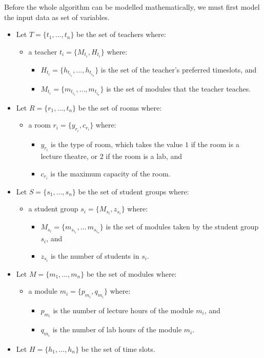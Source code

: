 \documentclass[a4paper, 12pt]{report}
\begin{document}
Before the whole algorithm can be modelled mathematically, we must first model 
the input data as set of variables.
\begin{itemize}
	\item Let \( T = \{ t_1 , \ldots , t_n \} \) be the set of teachers where:
	\begin{itemize}
		\item a teacher \( t_i = \{ M_{t_i}, H_{t_i} \} \) where:
		\begin{itemize} 
			\item \( H_{t_i} = \{ h_{t_{i_1}} , \ldots , h_{t_{i_n}} \} \) is 
				the set of the teacher's preferred timeslots, and
			\item \( M_{t_i} = \{ m_{t_{i_1}} , \ldots , m_{t_{i_n}} \} \) is 
				the set of modules that the teacher teaches.
		\end{itemize}
	\end{itemize}
	\item Let \( R = \{ r_1 , \ldots , t_n \} \) be the set of rooms where:
	\begin{itemize}
		\item a room \( r_i = \{ y_{r_i} , c_{r_i} \} \) where:
		\begin{itemize}
			\item \( y_{r_i} \) is the type of room, which takes the value 
				\( 1 \) if the room is a lecture theatre, or \( 2 \) if the room
				is a lab, and
			\item \( c_{r_i} \) is the maximum capacity of the room.
		\end{itemize}
	\end{itemize}
	\item Let \( S = \{ s_1 , \ldots , s_n \} \) be the set of student groups
		where:
	\begin{itemize}
		\item a student group \( s_i = \{ M_{s_i} , z_{s_i} \} \) where:
		\begin{itemize}
			\item \( M_{s_i} = \{ m_{s_{i_1}} , \ldots \, m_{s_{i_n}} \} \) is 
				the set of modules taken by the student group \( s_i \), and
			\item \( z_{s_i} \) is the number of students in \( s_i \).
		\end{itemize} 
	\end{itemize}
	\item Let \( M = \{ m_1, \ldots, m_n \} \) be the set of modules where:
	\begin{itemize}
		\item a module \( m_i = \{ p_{m_i}, q_{m_i} \} \) where:
		\begin{itemize}
			\item \( p_{m_i} \) is the number of lecture hours of the module 
				\( m_i \), and 
			\item \( q_{m_i} \) is the number of lab hours of the module 
				\( m_i \).
		\end{itemize}
	\end{itemize}
	\item Let \( H = \{ h_1 , \ldots , h_n \} \) be the set of time slots.
\end{itemize}
\end{document}
